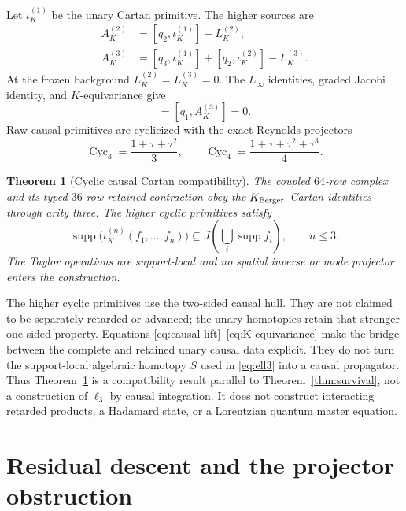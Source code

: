 \documentclass[11pt]{article}
\newtheorem{theorem}{Theorem}[section]
\theoremstyle{definition}
\theoremstyle{remark}
\newcommand{\supp}{\operatorname{supp}}
\newcommand{\Cyc}{\operatorname{Cyc}}
\begin{document}
Let $\iota_K^{(1)}$ be the unary Cartan primitive.  The higher sources are
\begin{align}
 A_K^{(2)}&=[q_2,\iota_K^{(1)}]-L_K^{(2)},\label{eq:A2}\\
 A_K^{(3)}&=[q_3,\iota_K^{(1)}]+[q_2,\iota_K^{(2)}]-L_K^{(3)}.
 \label{eq:A3}
\end{align}
At the frozen background $L_K^{(2)}=L_K^{(3)}=0$.  The $L_\infty$ identities,
graded Jacobi identity, and $K$-equivariance give
\begin{equation}
 [q_1,A_K^{(2)}]=[q_1,A_K^{(3)}]=0.
\end{equation}
Raw causal primitives are cyclicized with the exact Reynolds projectors
\begin{equation}
 \Cyc_3=\frac{1+\tau+\tau^2}{3},
 \qquad
 \Cyc_4=\frac{1+\tau+\tau^2+\tau^3}{4}.
\end{equation}

\begin{theorem}[Cyclic causal Cartan compatibility]
\label{thm:cartan}
The coupled $64$-row complex and its typed $36$-row retained contraction obey
the $K_{\rm Berger}$ Cartan identities through arity three.  The higher cyclic
primitives satisfy
\begin{equation}\label{eq:support}
 \supp\bigl(\iota_K^{(n)}(f_1,\ldots,f_n)\bigr)
 \subseteq J\!\left(\bigcup_i\supp f_i\right),
 \qquad n\leq3.
\end{equation}
The Taylor operations are support-local and no spatial inverse or mode
projector enters the construction.
\end{theorem}

The higher cyclic primitives use the two-sided causal hull.  They are not
claimed to be separately retarded or advanced; the unary homotopies retain
that stronger one-sided property.  Equations
\eqref{eq:causal-lift}--\eqref{eq:K-equivariance} make the bridge between the
complete and retained unary causal data explicit.  They do not turn the
support-local algebraic homotopy $S$ used in \eqref{eq:ell3} into a causal
propagator.  Thus Theorem~\ref{thm:cartan} is a compatibility result parallel
to Theorem~\ref{thm:survival}, not a construction of $\ell_3$ by causal
integration.  It does not construct interacting retarded products, a
Hadamard state, or a Lorentzian quantum master equation.

\section{Residual descent and the projector obstruction}\label{sec:mixing}
\end{document}
